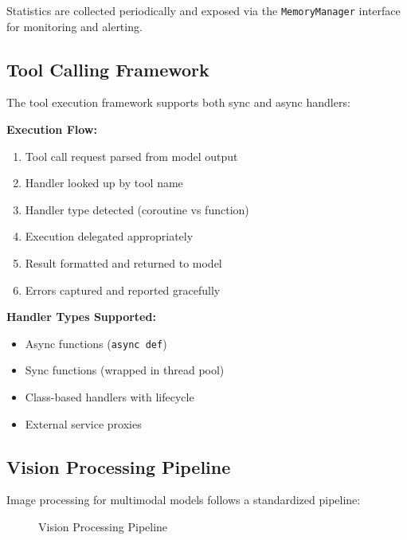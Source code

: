Statistics are collected periodically and exposed via the \texttt{MemoryManager} interface for monitoring and alerting.

\subsection{Tool Calling Framework}

The tool execution framework supports both sync and async handlers:

\textbf{Execution Flow:}
\begin{enumerate}
    \item Tool call request parsed from model output
    \item Handler looked up by tool name
    \item Handler type detected (coroutine vs function)
    \item Execution delegated appropriately
    \item Result formatted and returned to model
    \item Errors captured and reported gracefully
\end{enumerate}

\textbf{Handler Types Supported:}
\begin{itemize}
    \item Async functions (\texttt{async def})
    \item Sync functions (wrapped in thread pool)
    \item Class-based handlers with lifecycle
    \item External service proxies
\end{itemize}

\subsection{Vision Processing Pipeline}

Image processing for multimodal models follows a standardized pipeline:

\begin{figure}[h]
\centering
{}
\caption{Vision Processing Pipeline}
\label{fig:vision_pipeline}
\end{figure}

